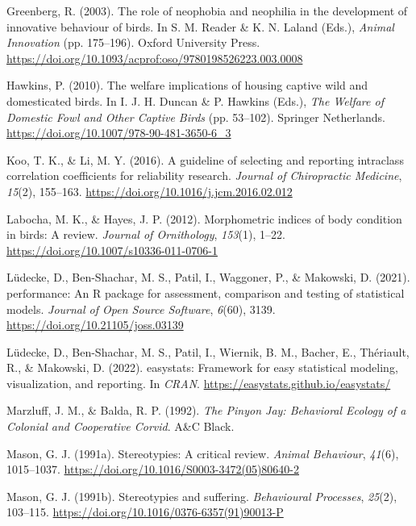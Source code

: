 \documentclass[
  pub]{apa6}
\newlength{\cslhangindent}
\newenvironment{CSLReferences}[2] %
 {\begin{list}{}{%
  \setlength{\itemindent}{0pt}
  \setlength{\leftmargin}{0pt}
  \setlength{\parsep}{0pt}
  \ifodd #1
   \setlength{\leftmargin}{\cslhangindent}
   \setlength{\itemindent}{-1\cslhangindent}
  \fi
  \setlength{\itemsep}{#2\baselineskip}}}
 {\end{list}}
\begin{document}
\begin{CSLReferences}{1}{0}
Greenberg, R. (2003). The role of neophobia and neophilia in the development of innovative behaviour of birds. In S. M. Reader \& K. N. Laland (Eds.), \emph{Animal {Innovation}} (pp. 175--196). Oxford University Press. \url{https://doi.org/10.1093/acprof:oso/9780198526223.003.0008}

Hawkins, P. (2010). The welfare implications of housing captive wild and domesticated birds. In I. J. H. Duncan \& P. Hawkins (Eds.), \emph{The {Welfare} of {Domestic Fowl} and {Other Captive Birds}} (pp. 53--102). Springer Netherlands. \url{https://doi.org/10.1007/978-90-481-3650-6_3}

Koo, T. K., \& Li, M. Y. (2016). A guideline of selecting and reporting intraclass correlation coefficients for reliability research. \emph{Journal of Chiropractic Medicine}, \emph{15}(2), 155--163. \url{https://doi.org/10.1016/j.jcm.2016.02.012}

Labocha, M. K., \& Hayes, J. P. (2012). Morphometric indices of body condition in birds: A review. \emph{Journal of Ornithology}, \emph{153}(1), 1--22. \url{https://doi.org/10.1007/s10336-011-0706-1}

Lüdecke, D., Ben-Shachar, M. S., Patil, I., Waggoner, P., \& Makowski, D. (2021). {performance}: An {R} package for assessment, comparison and testing of statistical models. \emph{Journal of Open Source Software}, \emph{6}(60), 3139. \url{https://doi.org/10.21105/joss.03139}

Lüdecke, D., Ben-Shachar, M. S., Patil, I., Wiernik, B. M., Bacher, E., Thériault, R., \& Makowski, D. (2022). {easystats}: Framework for easy statistical modeling, visualization, and reporting. In \emph{CRAN}. \url{https://easystats.github.io/easystats/}

Marzluff, J. M., \& Balda, R. P. (1992). \emph{The {Pinyon Jay}: {Behavioral Ecology} of a {Colonial} and {Cooperative Corvid}}. A\&C Black.

Mason, G. J. (1991a). Stereotypies: A critical review. \emph{Animal Behaviour}, \emph{41}(6), 1015--1037. \url{https://doi.org/10.1016/S0003-3472(05)80640-2}

Mason, G. J. (1991b). Stereotypies and suffering. \emph{Behavioural Processes}, \emph{25}(2), 103--115. \url{https://doi.org/10.1016/0376-6357(91)90013-P}


\end{CSLReferences}
\end{document}
